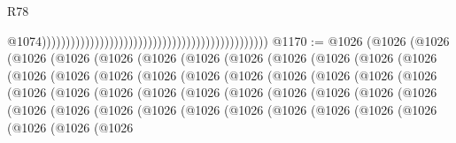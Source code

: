 \begin{lexlean}{R78}
\begin{coremodule}
                                                                                                  @1074)))))))))))))))))))))))))))))))))))))))))))))))
@1170 := @1026
    (@1026
      (@1026
        (@1026
          (@1026
            (@1026
              (@1026
                (@1026
                  (@1026
                    (@1026
                      (@1026
                        (@1026
                          (@1026
                            (@1026
                              (@1026
                                (@1026
                                  (@1026
                                    (@1026
                                      (@1026
                                        (@1026
                                          (@1026
                                            (@1026
                                              (@1026
                                                (@1026
                                                  (@1026
                                                    (@1026
                                                      (@1026
                                                        (@1026
                                                          (@1026
                                                            (@1026
                                                              (@1026
                                                                (@1026
                                                                  (@1026
                                                                    (@1026
                                                                      (@1026
                                                                        (@1026
                                                                          (@1026
                                                                            (@1026
                                                                              (@1026
                                                                                (@1026
                                                                                  (@1026
                                                                                    (@1026
                                                                                      (@1026
                                                                                        (@1026
                                                                                          (@1026
                                                                                            (@1026

\end{coremodule}
\end{lexlean}
